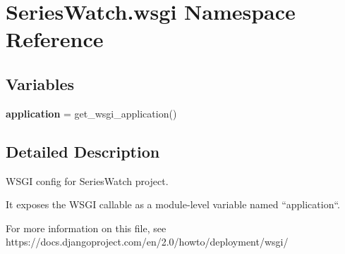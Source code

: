 \hypertarget{namespace_series_watch_1_1wsgi}{}\section{Series\+Watch.\+wsgi Namespace Reference}
\label{namespace_series_watch_1_1wsgi}
\subsection*{Variables}
\begin{DoxyCompactItemize}
\item 
\mbox{\label{namespace_series_watch_1_1wsgi_a82a0c01067a314be11ab4e2fcb75c01f}} 
{\bfseries application} = get\+\_\+wsgi\+\_\+application()
\end{DoxyCompactItemize}


\subsection{Detailed Description}
\begin{DoxyVerb}WSGI config for SeriesWatch project.

It exposes the WSGI callable as a module-level variable named ``application``.

For more information on this file, see
https://docs.djangoproject.com/en/2.0/howto/deployment/wsgi/
\end{DoxyVerb}
 